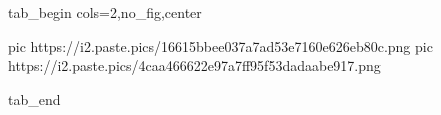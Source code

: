  
 
 
 
 


\ifcmt
  tab_begin cols=2,no_fig,center

     pic https://i2.paste.pics/16615bbee037a7ad53e7160e626eb80c.png
		 pic https://i2.paste.pics/4caa466622e97a7ff95f53dadaabe917.png

  tab_end
\fi
